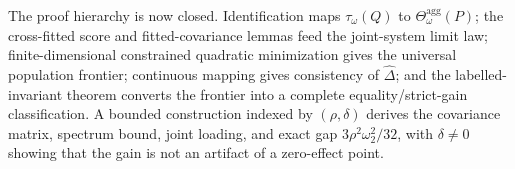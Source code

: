 The proof hierarchy is now closed. Identification maps \(\tau_\omega(Q)\) to \(\Theta_\omega^{\mathrm{agg}}(P)\); the cross-fitted score and fitted-covariance lemmas feed the joint-system limit law; finite-dimensional constrained quadratic minimization gives the universal population frontier; continuous mapping gives consistency of \(\widehat\Delta\); and the labelled-invariant theorem converts the frontier into a complete equality/strict-gain classification. A bounded construction indexed by \((\rho,\delta)\) derives the covariance matrix, spectrum bound, joint loading, and exact gap \(3\rho^2\omega_2^2/32\), with \(\delta\ne0\) showing that the gain is not an artifact of a zero-effect point.